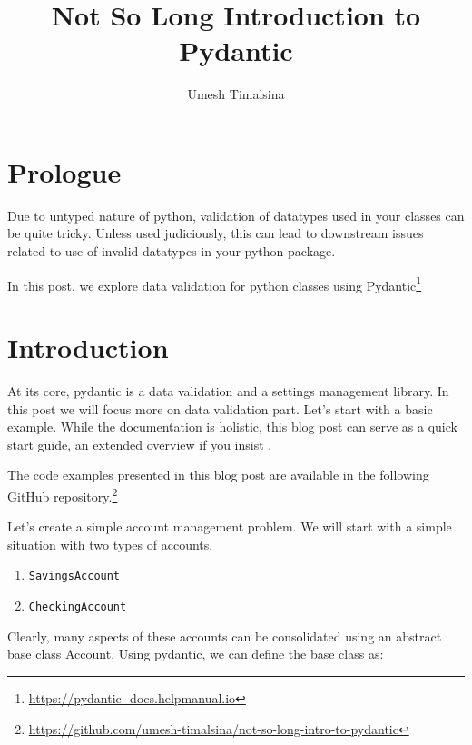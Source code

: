 \documentclass[12pt]{article}
\title{Not So Long Introduction to Pydantic}
\author{Umesh Timalsina}
\begin{document}
    \maketitle
    \section*{Prologue}

        Due to untyped nature of python, validation of datatypes used in your classes can be quite tricky. Unless used judiciously, this can lead to downstream issues related to use of invalid datatypes in your python package.

        In this post, we explore data validation for python classes using Pydantic\footnote{\url{https://pydantic-
        docs.helpmanual.io}}

    \section*{Introduction}
    At its core, pydantic is a data validation and a settings management library. In this post we will focus more on data validation part. Let's start with a basic example. While the documentation is holistic, this blog post can serve as a quick start guide, an extended overview if you insist \dSmiley.

The code examples presented in this blog post are available in the following GitHub repository.\footnote{\url{https://github.com/umesh-timalsina/not-so-long-intro-to-pydantic}}

Let's create a simple account management problem. We will start with a simple situation with two types of accounts.
    
    \begin{enumerate}
        \item \texttt{SavingsAccount}
        \item \texttt{CheckingAccount}
    \end{enumerate}

    Clearly, many aspects of these accounts can be consolidated using an abstract base class Account. Using pydantic, we can define the base class as:
\end{document}
